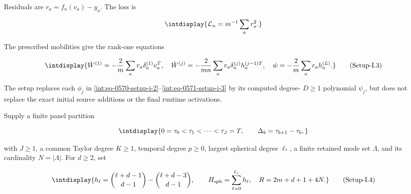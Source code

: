
Residuals are \(r_a=f_n(v_a)-y_a\). The loss is


\begingroup\renewcommand{\theHequation}{intdisplay.1082}
\begin{equation*}
\intdisplay{
\mathcal L_n=m^{-1}\sum_a r_a^2.
}
\end{equation*}
\endgroup


The prescribed mobilities give the rank-one equations


\label{int:eq-setup-i-3}
\begingroup\renewcommand{\theHequation}{intdisplay.1083}
\begin{equation}
\intdisplay{
\dot W^{(1)}=-\frac2m\sum_a r_a\delta_a^{(1)}v_a^T,
\quad
\dot W^{(j)}=-\frac2{mn}\sum_a r_a\delta_a^{(j)}h_a^{(j-1)T},
\quad
\dot w=-\frac2m\sum_a r_ah_a^{(L)}.
}
\tag{Setup-I.3}
\label{int:eq-0571-setup-i-3}
\end{equation}
\endgroup


The setup replaces each \(\phi_j\) in \hyperref[int:eq-setup-i-2]{\eqref{int:eq-0570-setup-i-2}}--\allowbreak \hyperref[int:eq-setup-i-3]{\eqref{int:eq-0571-setup-i-3}} by its computed degree- \(D\ge1\) polynomial \(\psi_j\), but does not replace the exact initial source additions or the final runtime activations.



Supply a finite panel partition


\begingroup\renewcommand{\theHequation}{intdisplay.1084}
\begin{equation*}
\intdisplay{
0=\tau_0<\tau_1<\cdots<\tau_J=T,\qquad
\Delta_b=\tau_{b+1}-\tau_b,
}
\end{equation*}
\endgroup


with \(J\ge1\), a common Taylor degree \(K\ge1\), temporal degree \(p\ge0\), largest spherical degree \(\ell_*\), a finite retained mode set \(\Lambda\), and its cardinality \(N=|\Lambda|\). For \(d\ge2\), set


\label{int:eq-setup-i-4}
\begingroup\renewcommand{\theHequation}{intdisplay.1085}
\begin{equation}
\intdisplay{
h_\ell=\binom{\ell+d-1}{d-1}-\binom{\ell+d-3}{d-1},\qquad
H_{\rm sph}=\sum_{\ell=0}^{\ell_*}h_\ell,
\quad R=2m+d+1+4N.
}
\tag{Setup-I.4}
\label{int:eq-0572-setup-i-4}
\end{equation}
\endgroup

